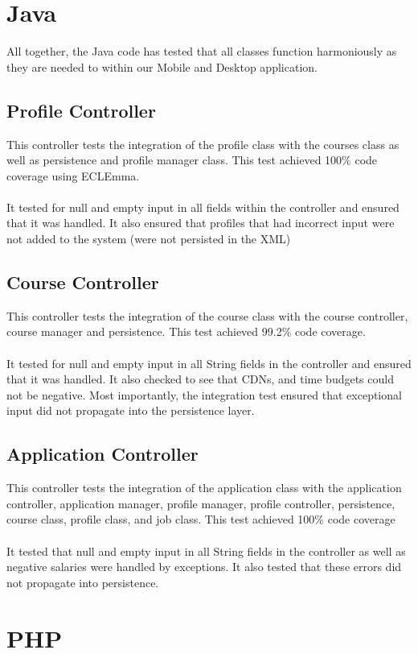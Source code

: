 \documentclass[12pt]{report}
\begin{document}
\section{Java}
All together, the Java code has tested that all classes function harmoniously as they are needed to within our Mobile and Desktop application.

\subsection{Profile Controller}
This controller tests the integration of the profile class with the courses class as well as persistence and profile manager class. This test achieved 100\% code coverage using ECLEmma. \\\\
It tested for null and empty input in all fields within the controller and ensured that it was handled. It also ensured that profiles that had incorrect input were not added to the system (were not persisted in the XML)

\subsection{Course Controller}
This controller tests the integration of the course class with the course controller, course manager and persistence. This test achieved 99.2\% code coverage. \\\\
It tested for null and empty input in all String fields in the controller and ensured that it was handled. It also checked to see that CDNs, and time budgets could not be negative. Most importantly, the integration test ensured that exceptional input did not propagate into the persistence layer.

\subsection{Application Controller}
This controller tests the integration of the application class with the application controller, application manager, profile manager, profile controller, persistence, course class, profile class, and job class. This test achieved 100\% code coverage \\\\
It tested that null and empty input in all String fields in the controller as well as negative salaries were handled by exceptions. It also tested that these errors did not propagate into persistence. 

\section{PHP}
\end{document}
